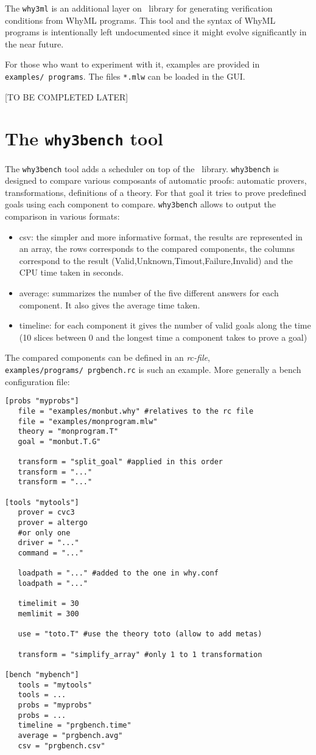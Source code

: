 The \texttt{why3ml} is an additional layer on \why\ library for
generating verification conditions from WhyML programs. This tool and
the syntax of WhyML programs is intentionally left undocumented since
it might evolve significantly in the near future.

For those who want to experiment with it, examples are provided in
\texttt{examples/\ programs}. The files \texttt{*.mlw} can be loaded in
the GUI.

[TO BE COMPLETED LATER]

\section{The \texttt{why3bench} tool}

The \texttt{why3bench} tool adds a scheduler on top of the \why\
library. \texttt{why3bench} is designed to compare various composants
of automatic proofs: automatic provers, transformations, definitions
of a theory. For that goal it tries to prove predefined goals using
each component to compare. \texttt{why3bench} allows to output the
comparison in various formats:
\begin{itemize}
\item csv: the simpler and more informative format, the results are
  represented in an array, the rows corresponds to the
  compared components, the columns correspond to the result
  (Valid,Unknown,Timout,Failure,Invalid) and the CPU time taken in seconds.
\item average: summarizes the number of the five different answers
  for each component. It also gives the average time taken.
\item timeline: for each component it gives the number of valid goals
  along the time (10 slices between 0 and the longest time a component
  takes to prove a goal)
\end{itemize}

The compared components can be defined in an \emph{rc-file},
\texttt{examples/programs/\ prgbench.rc} is such an example. More
generally a bench configuration file:
\begin{verbatim}
[probs "myprobs"]
   file = "examples/monbut.why" #relatives to the rc file
   file = "examples/monprogram.mlw"
   theory = "monprogram.T"
   goal = "monbut.T.G"

   transform = "split_goal" #applied in this order
   transform = "..."
   transform = "..."

[tools "mytools"]
   prover = cvc3
   prover = altergo
   #or only one
   driver = "..."
   command = "..."

   loadpath = "..." #added to the one in why.conf
   loadpath = "..."

   timelimit = 30
   memlimit = 300

   use = "toto.T" #use the theory toto (allow to add metas)

   transform = "simplify_array" #only 1 to 1 transformation

[bench "mybench"]
   tools = "mytools"
   tools = ...
   probs = "myprobs"
   probs = ...
   timeline = "prgbench.time"
   average = "prgbench.avg"
   csv = "prgbench.csv"
\end{verbatim}

